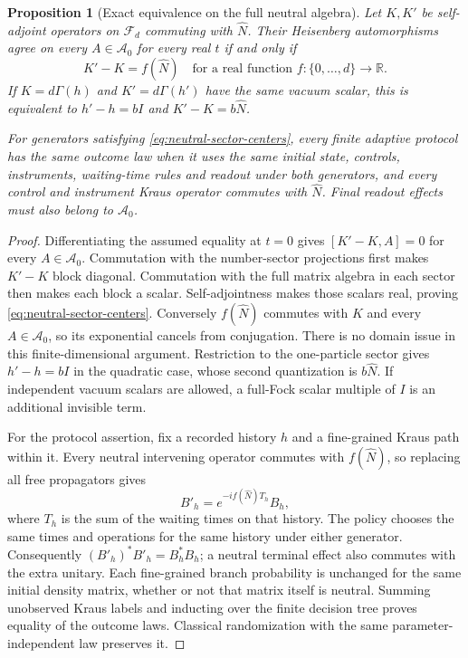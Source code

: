 \documentclass[11pt]{article}
\newtheorem{proposition}[theorem]{Proposition}
\theoremstyle{definition}
\begin{document}
\begin{proposition}[Exact equivalence on the full neutral algebra]
\label{prop:neutral-generator}
Let $K,K'$ be self-adjoint operators on $\mathcal F_d$ commuting with
$\widehat N$. Their Heisenberg automorphisms agree on every
$A\in\mathcal A_0$ for every real $t$ if and only if
\begin{equation}
 K'-K=f(\widehat N)
 \quad\text{for a real function }f:\{0,\ldots,d\}\longrightarrow\mathbb R.
 \label{eq:neutral-sector-centers}
\end{equation}
If $K=d\Gamma(h)$ and $K'=d\Gamma(h')$ have the same vacuum scalar,
this is equivalent to $h'-h=bI$ and $K'-K=b\widehat N$.

For generators satisfying \eqref{eq:neutral-sector-centers}, every finite
adaptive protocol has the same outcome law when it uses the same initial
state, controls, instruments, waiting-time rules and readout under both
generators, and every control and instrument Kraus operator commutes with
$\widehat N$. Final readout effects must also belong to $\mathcal A_0$.
\end{proposition}
\begin{proof}
Differentiating the assumed equality at $t=0$ gives
$[K'-K,A]=0$ for every $A\in\mathcal A_0$. Commutation with the number-sector
projections first makes $K'-K$ block diagonal. Commutation with the full
matrix algebra in each sector then makes each block a scalar. Self-adjointness
makes those scalars real, proving \eqref{eq:neutral-sector-centers}.
Conversely $f(\widehat N)$ commutes with $K$ and every $A\in\mathcal A_0$,
so its exponential cancels from conjugation. There is no domain issue in
this finite-dimensional argument. Restriction to the one-particle sector
gives $h'-h=bI$ in the quadratic case, whose second quantization is
$b\widehat N$. If independent vacuum scalars are allowed, a full-Fock
scalar multiple of $I$ is an additional invisible term.

For the protocol assertion, fix a recorded history $h$ and a fine-grained
Kraus path within it. Every neutral intervening operator commutes with
$f(\widehat N)$, so replacing all free propagators gives
\[
 B'_h=e^{-if(\widehat N)T_h}B_h,
\]
where $T_h$ is the sum of the waiting times on that history. The policy
chooses the same times and operations for the same history under either
generator. Consequently $(B'_h)^*B'_h=B_h^*B_h$; a neutral terminal effect
also commutes with the extra unitary. Each fine-grained branch probability
is unchanged for the same initial density matrix, whether or not that
matrix itself is neutral. Summing unobserved Kraus labels and inducting over
the finite decision tree proves equality of the outcome laws. Classical
randomization with the same parameter-independent law preserves it.
\end{proof}
\end{document}
